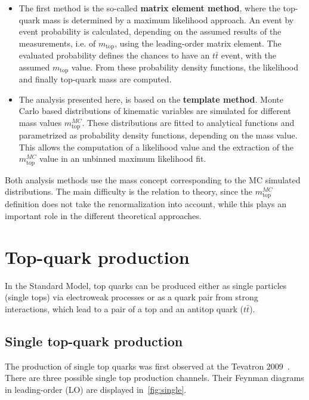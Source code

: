 \begin{itemize}
	
	\item The first method is the so-called \textbf{matrix element method}, where the top-quark mass is determined by a maximum likelihood approach. An event by event probability is calculated, depending on the assumed results of the measurements, i.e. of $m_{\text{top}}$, using the leading-order matrix element. The evaluated probability defines the chances to have an $t\bar{t}$ event, with the assumed $m_{\text{top}}$ value. From these probability density functions, the likelihood and finally top-quark mass are computed.~\cite{Castro:2014cva}   
	
	\item The analysis presented here, is based on the \textbf{template method}. Monte Carlo based distributions of kinematic variables are simulated for different mass values $m_{	\text{top}}^{MC}$. These distributions are fitted to analytical functions and parametrized as probability density functions,  depending on the mass value. This allows the computation of a likelihood value and the extraction of the $m_{\text{top}}^{MC}$ value in an unbinned maximum likelihood fit.   
\end{itemize}

 Both analysis methods use the  mass concept corresponding to the MC simulated distributions. The main difficulty is the relation to  theory, since  the $m_{	\text{top}}^{MC}$ definition does not take the  renormalization into account, while this plays an  important role in the different theoretical approaches. 











   

\section{Top-quark production}
In the Standard Model, top quarks can be produced either as single particles 
(single tops) via electroweak processes or as a quark pair from strong interactions, which lead to a pair of a top and an antitop quark ($t\bar{t}$).    

\subsection{Single top-quark production}
The production of single top quarks was first observed at the Tevatron 2009~\cite{Abazov:2009ii,Aaltonen:2009jj}. There are three possible single top production channels. Their Feynman diagrams in leading-order (LO) are displayed in~\cref{fig:single}.


